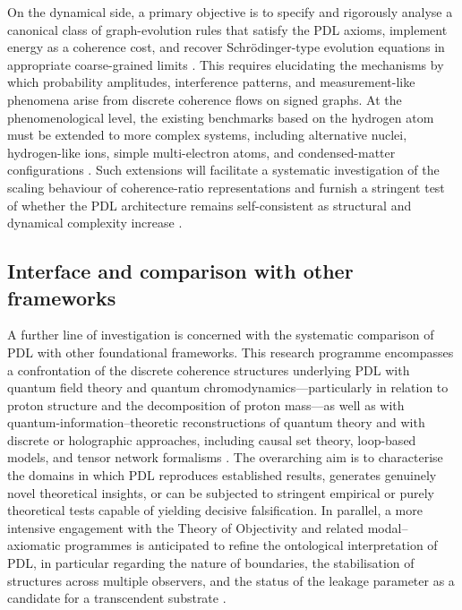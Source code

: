 \documentclass[11pt,a4paper]{article}
\begin{document}
On the dynamical side, a primary objective is to specify and rigorously analyse a canonical class of graph-evolution rules that satisfy the PDL axioms, implement energy as a coherence cost, and recover Schr\"odinger-type evolution equations in appropriate coarse-grained limits \citep{Coherence_Leakage_18_2026,Coherence_Leakage_18_2026}. This requires elucidating the mechanisms by which probability amplitudes, interference patterns, and measurement-like phenomena arise from discrete coherence flows on signed graphs. At the phenomenological level, the existing benchmarks based on the hydrogen atom must be extended to more complex systems, including alternative nuclei, hydrogen-like ions, simple multi-electron atoms, and condensed-matter configurations \citep{PDL_Main_2026,Schrodinger_Sketch_v2_2026}. Such extensions will facilitate a systematic investigation of the scaling behaviour of coherence-ratio representations and furnish a stringent test of whether the PDL architecture remains self-consistent as structural and dynamical complexity increase \cite{PDL_position}.

\subsection{Interface and comparison with other frameworks}
\label{subsec:roadmap_interface}

A further line of investigation is concerned with the systematic comparison of PDL with other foundational frameworks. This research programme encompasses a confrontation of the discrete coherence structures underlying PDL with quantum field theory and quantum chromodynamics—particularly in relation to proton structure and the decomposition of proton mass—as well as with quantum-information–theoretic reconstructions of quantum theory and with discrete or holographic approaches, including causal set theory, loop-based models, and tensor network formalisms \citep{PDL_intro,PDL_position}. The overarching aim is to characterise the domains in which PDL reproduces established results, generates genuinely novel theoretical insights, or can be subjected to stringent empirical or purely theoretical tests capable of yielding decisive falsification. In parallel, a more intensive engagement with the Theory of Objectivity and related modal–axiomatic programmes is anticipated to refine the ontological interpretation of PDL, in particular regarding the nature of boundaries, the stabilisation of structures across multiple observers, and the status of the leakage parameter as a candidate for a transcendent substrate \citep{PDL_TO_dialogue,PDL_position}.
\end{document}
